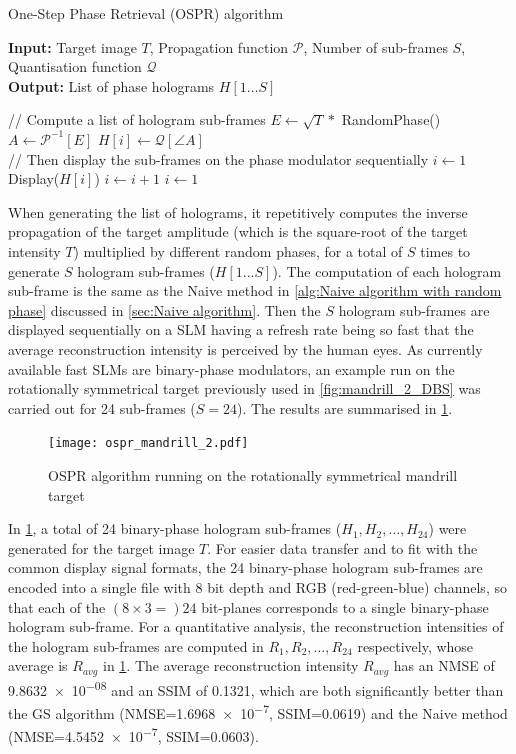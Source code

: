 \begin{algorithm}[H]
  \caption{One-Step Phase Retrieval (OSPR) algorithm}\label{alg:One-Step Phase Retrieval (OSPR) algorithm}
  \textbf{Input:} Target image $T$, Propagation function $\mathcal{P}$, Number of sub-frames $S$, Quantisation function $\mathcal{Q}$\\
  \textbf{Output:} List of phase holograms $H[1\ldots S]$
  \begin{algorithmic}
    \State // Compute a list of hologram sub-frames
    \State $E \gets \sqrt{T} * $ RandomPhase()
    \State $A \gets \mathcal{P}^{-1}[E]$
    \State $H[i] \gets \mathcal{Q}[\angle A]$
    \EndFor\\
    \State // Then display the sub-frames on the phase modulator sequentially
    \State $i\gets 1$
    \State Display($H[i]$)
    \State $i\gets i + 1$
    \State $i\gets 1$
    \EndIf
    \EndWhile
  \end{algorithmic}
\end{algorithm}

When generating the list of holograms, it repetitively computes the inverse propagation of the target amplitude (which is the square-root of the target intensity $T$) multiplied by different random phases, for a total of $S$ times to generate $S$ hologram sub-frames ($H[1\ldots S]$). The computation of each hologram sub-frame is the same as the Naive method in \cref{alg:Naive algorithm with random phase} discussed in \cref{sec:Naive algorithm}. Then the $S$ hologram sub-frames are displayed sequentially on a SLM having a refresh rate being so fast that the average reconstruction intensity is perceived by the human eyes. As currently available fast SLMs are binary-phase modulators, an example run on the rotationally symmetrical target previously used in \cref{fig:mandrill_2_DBS} was carried out for 24 sub-frames ($S=24$). The results are summarised in \cref{fig:ospr_mandrill_2}.

\begin{figure}[H]
	\centering
	\texttt{[image: ospr\_mandrill\_2.pdf]}
	\caption{OSPR algorithm running on the rotationally symmetrical mandrill target}
	\label{fig:ospr_mandrill_2}
\end{figure}

In \cref{fig:ospr_mandrill_2}, a total of 24 binary-phase hologram sub-frames ($H_1, H_2, \ldots, H_{24}$) were generated for the target image $T$. For easier data transfer and to fit with the common display signal formats, the 24 binary-phase hologram sub-frames are encoded into a single file with 8 bit depth and RGB (red-green-blue) channels, so that each of the $(8\times 3 = )24$ bit-planes corresponds to a single binary-phase hologram sub-frame. For a quantitative analysis, the reconstruction intensities of the hologram sub-frames are computed in $R_1, R_2, \ldots, R_{24}$ respectively, whose average is $R_{avg}$ in \cref{fig:ospr_mandrill_2}. The average reconstruction intensity $R_{avg}$ has an NMSE of \num{9.8632e-08} and an SSIM of 0.1321, which are both significantly better than the GS algorithm (NMSE=\num{1.6968e-7}, SSIM=0.0619) and the Naive method (NMSE=\num{4.5452e-7}, SSIM=0.0603).


